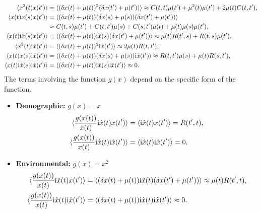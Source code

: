 \documentclass[
    preprint,
    linenumbers,
    amsmath,amssymb,amsfonts,
    aps, physrev,
    superscriptaddress,
    10pt,
    bibnotes
    ]{revtex4-2}
\begin{document}
\begin{align*}
  \langle x^2(t)x(t') \rangle & = \langle (\delta x(t)+\mu(t))^2 (\delta x(t')+\mu(t')) \rangle \approx C(t,t)\mu(t') + \mu^2(t)\mu(t') + 2\mu(t)C(t,t'),\\
  \langle x(t)x(s)x(t') \rangle & = \langle (\delta x(t)+\mu(t)) (\delta x(s)+\mu(s)) (\delta x(t')+\mu(t')) \rangle \\
  & \approx C(t,s)\mu(t')+C(t,t')\mu(s)+C(s,t')\mu(t)+\mu(t)\mu(s)\mu(t'),\\
  \langle x(t){\rm i}\hat{x}(s)x(t') \rangle & = \langle (\delta x(t)+\mu(t)) {\rm i}\hat{x}(s) (\delta x(t')+\mu(t')) \rangle \approx \mu(t)R(t',s) + R(t,s)\mu(t'),\\
  \langle x^2(t){\rm i}\hat{x}(t') \rangle & = \langle (\delta x(t)+\mu(t))^2 {\rm i}\hat{x}(t') \rangle \approx 2\mu(t)R(t,t'),\\
  \langle x(t)x(s){\rm i}\hat{x}(t') \rangle & = \langle (\delta x(t)+\mu(t)) (\delta x(s)+\mu(s)) {\rm i}\hat{x}(t') \rangle \approx R(t,t')\mu(s)+\mu(t) R(s,t'),\\
  \langle x(t){\rm i}\hat{x}(s){\rm i}\hat{x}(t') \rangle & = \langle (\delta x(t)+\mu(t)) {\rm i}\hat{x}(s) {\rm i}\hat{x}(t') \rangle \approx 0.
\end{align*}
The terms involving the function $g(x)$ depend on the specific form of the function.
\begin{itemize}
\item \textbf{Demographic:} $g(x) = x$
  \begin{align*}
    \langle \frac{g(x(t))}{x(t)}{\rm i}\hat{x}(t)x(t') \rangle & = \langle {\rm i}\hat{x}(t) x(t')\rangle = R(t',t),\\
    \langle \frac{g(x(t))}{x(t)}{\rm i}\hat{x}(t){\rm i}\hat{x}(t') \rangle & = \langle {\rm i}\hat{x}(t){\rm i}\hat{x}(t') \rangle = 0.
  \end{align*}
\item \textbf{Environmental:} $g(x) = x^2$
  \begin{align*}
    \langle \frac{g(x(t))}{x(t)}{\rm i}\hat{x}(t)x(t') \rangle & = \langle (\delta x(t)+\mu(t)){\rm i}\hat{x}(t)(\delta x(t')+\mu(t')) \rangle \approx \mu(t)R(t',t),\\
    \langle \frac{g(x(t))}{x(t)}{\rm i}\hat{x}(t){\rm i}\hat{x}(t') \rangle & = \langle (\delta x(t)+\mu(t)){\rm i}\hat{x}(t){\rm i}\hat{x}(t') \rangle \approx 0.
  \end{align*}
\end{itemize}
\end{document}
